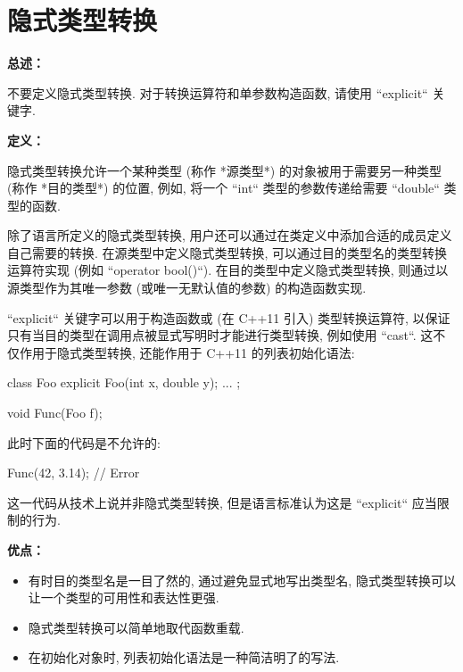 \section{隐式类型转换} \label{implicit-conversions}

\textbf{总述：}

不要定义隐式类型转换. 对于转换运算符和单参数构造函数, 请使用 ``explicit`` 关键字.

\textbf{定义：}

隐式类型转换允许一个某种类型 (称作 *源类型*) 的对象被用于需要另一种类型 (称作 *目的类型*) 的位置, 例如, 将一个 ``int`` 类型的参数传递给需要 ``double`` 类型的函数.

除了语言所定义的隐式类型转换, 用户还可以通过在类定义中添加合适的成员定义自己需要的转换. 在源类型中定义隐式类型转换, 可以通过目的类型名的类型转换运算符实现 (例如 ``operator bool()``). 在目的类型中定义隐式类型转换, 则通过以源类型作为其唯一参数 (或唯一无默认值的参数) 的构造函数实现.

``explicit`` 关键字可以用于构造函数或 (在 C++11 引入) 类型转换运算符, 以保证只有当目的类型在调用点被显式写明时才能进行类型转换, 例如使用 ``cast``. 这不仅作用于隐式类型转换, 还能作用于 C++11 的列表初始化语法:

\begin{cppcode}
class Foo {
  explicit Foo(int x, double y);
  ...
};

void Func(Foo f);
\end{cppcode}

此时下面的代码是不允许的:

  \begin{cppcode}
Func({42, 3.14});  // Error
\end{cppcode}

这一代码从技术上说并非隐式类型转换, 但是语言标准认为这是 ``explicit`` 应当限制的行为.

\textbf{优点：}

\begin{itemize}
  \item 有时目的类型名是一目了然的, 通过避免显式地写出类型名, 隐式类型转换可以让一个类型的可用性和表达性更强.
  \item 隐式类型转换可以简单地取代函数重载.
  \item 在初始化对象时, 列表初始化语法是一种简洁明了的写法.
\end{itemize}


